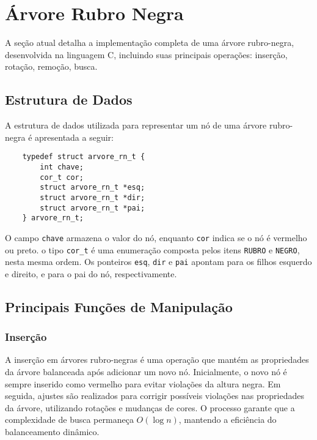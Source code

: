 \section{Árvore Rubro Negra}

A seção atual detalha a implementação completa de uma árvore rubro-negra, desenvolvida na linguagem C, incluindo suas principais operações: inserção, rotação, remoção, busca.

\vspace{3mm}

\subsection{Estrutura de Dados}

A estrutura de dados utilizada para representar um nó de uma árvore rubro-negra é apresentada a seguir:

\begin{lstlisting}
    typedef struct arvore_rn_t {
        int chave;                 
        cor_t cor;                 
        struct arvore_rn_t *esq;   
        struct arvore_rn_t *dir;   
        struct arvore_rn_t *pai;   
    } arvore_rn_t;
\end{lstlisting}

O campo \texttt{chave} armazena o valor do nó, enquanto \texttt{cor} indica se o nó é vermelho ou preto. o tipo \texttt{cor\_t} é uma enumeração composta pelos itens \texttt{RUBRO} e \texttt{NEGRO}, nesta mesma ordem. Os ponteiros \texttt{esq}, \texttt{dir} e \texttt{pai} apontam para os filhos esquerdo e direito, e para o pai do nó, respectivamente.

\vspace{3mm}

\subsection{Principais Funções de Manipulação}

\subsubsection{Inserção}

A inserção em árvores rubro-negras é uma operação que mantém as propriedades da árvore balanceada após adicionar um novo nó. Inicialmente, o novo nó é sempre inserido como vermelho para evitar violações da altura negra. Em seguida, ajustes são realizados para corrigir possíveis violações nas propriedades da árvore, utilizando rotações e mudanças de cores. O processo garante que a complexidade de busca permaneça \(O(\log n)\), mantendo a eficiência do balanceamento dinâmico.

